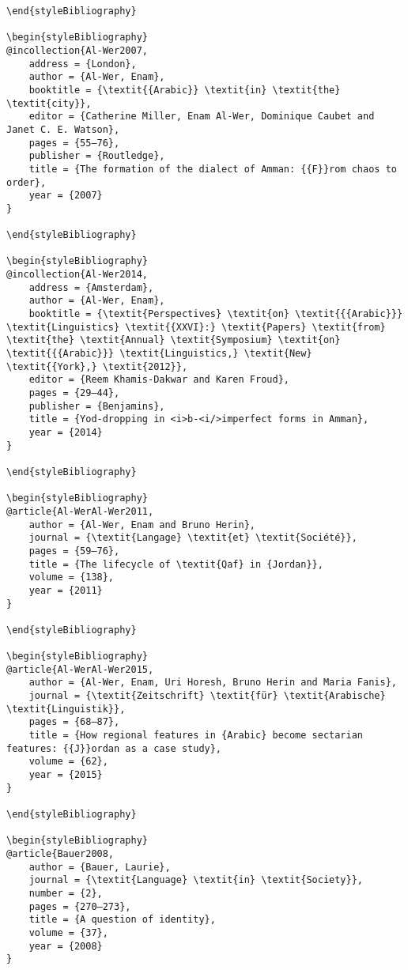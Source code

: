 \documentclass[output=paper]{langsci/langscibook}
\begin{document}
\begin{verbatim}
\end{styleBibliography}

\begin{styleBibliography}
@incollection{Al-Wer2007,
	address = {London},
	author = {Al-Wer, Enam},
	booktitle = {\textit{{Arabic}} \textit{in} \textit{the} \textit{city}},
	editor = {Catherine Miller, Enam Al-Wer, Dominique Caubet and Janet C. E. Watson},
	pages = {55–76},
	publisher = {Routledge},
	title = {The formation of the dialect of Amman: {{F}}rom chaos to order},
	year = {2007}
}

\end{styleBibliography}

\begin{styleBibliography}
@incollection{Al-Wer2014,
	address = {Amsterdam},
	author = {Al-Wer, Enam},
	booktitle = {\textit{Perspectives} \textit{on} \textit{{{Arabic}}} \textit{Linguistics} \textit{{XXVI}:} \textit{Papers} \textit{from} \textit{the} \textit{Annual} \textit{Symposium} \textit{on} \textit{{{Arabic}}} \textit{Linguistics,} \textit{New} \textit{{York},} \textit{2012}},
	editor = {Reem Khamis-Dakwar and Karen Froud},
	pages = {29–44},
	publisher = {Benjamins},
	title = {Yod-dropping in <i>b-<i/>imperfect forms in Amman},
	year = {2014}
}

\end{styleBibliography}

\begin{styleBibliography}
@article{Al-WerAl-Wer2011,
	author = {Al-Wer, Enam and Bruno Herin},
	journal = {\textit{Langage} \textit{et} \textit{Société}},
	pages = {59–76},
	title = {The lifecycle of \textit{Qaf} in {Jordan}},
	volume = {138},
	year = {2011}
}

\end{styleBibliography}

\begin{styleBibliography}
@article{Al-WerAl-Wer2015,
	author = {Al-Wer, Enam, Uri Horesh, Bruno Herin and Maria Fanis},
	journal = {\textit{Zeitschrift} \textit{für} \textit{Arabische} \textit{Linguistik}},
	pages = {68–87},
	title = {How regional features in {Arabic} become sectarian features: {{J}}ordan as a case study},
	volume = {62},
	year = {2015}
}

\end{styleBibliography}

\begin{styleBibliography}
@article{Bauer2008,
	author = {Bauer, Laurie},
	journal = {\textit{Language} \textit{in} \textit{Society}},
	number = {2},
	pages = {270–273},
	title = {A question of identity},
	volume = {37},
	year = {2008}
}


\end{verbatim}
\end{document}
